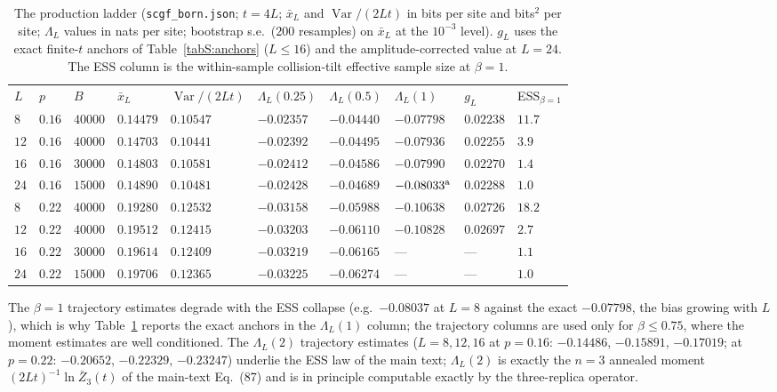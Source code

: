 \documentclass[aps,prx,reprint,superscriptaddress,nobibnotes,longbibliography]{revtex4-2}
\begin{document}
\begin{table}[t]
\caption{The production ladder (\texttt{scgf\_born.json}; $t=4L$;
$\bar x_L$ and $\operatorname{Var}/(2Lt)$ in bits per site and bits$^2$
per site; $\Lambda_L$ values in nats per site; bootstrap s.e.\ ($200$
resamples) on $\bar x_L$ at the $10^{-3}$ level).  $g_L$ uses the exact
finite-$t$ anchors of Table~\ref{tabS:anchors} ($L\le16$) and the
amplitude-corrected value at $L=24$.  The ESS column is the within-sample
collision-tilt effective sample size at $\beta=1$.}
\label{tabS:ladder}
\begin{ruledtabular}
\begin{tabular}{llllllllll}
$L$ & $p$ & $B$ & $\bar x_L$ & $\operatorname{Var}/(2Lt)$ &
$\Lambda_L(0.25)$ & $\Lambda_L(0.5)$ & $\Lambda_L(1)$ & $g_L$ &
ESS$_{\beta=1}$\\
\colrule
$8$ & $0.16$ & $40000$ & $0.14479$ & $0.10547$ & $-0.02357$ & $-0.04440$
 & $-0.07798$ & $0.02238$ & $11.7$\\
$12$ & $0.16$ & $40000$ & $0.14703$ & $0.10441$ & $-0.02392$ & $-0.04495$
 & $-0.07936$ & $0.02255$ & $3.9$\\
$16$ & $0.16$ & $30000$ & $0.14803$ & $0.10581$ & $-0.02412$ & $-0.04586$
 & $-0.07990$ & $0.02270$ & $1.4$\\
$24$ & $0.16$ & $15000$ & $0.14890$ & $0.10481$ & $-0.02428$ & $-0.04689$
 & $-0.08033^{\rm a}$ & $0.02288$ & $1.0$\\
$8$ & $0.22$ & $40000$ & $0.19280$ & $0.12532$ & $-0.03158$ & $-0.05988$
 & $-0.10638$ & $0.02726$ & $18.2$\\
$12$ & $0.22$ & $40000$ & $0.19512$ & $0.12415$ & $-0.03203$ & $-0.06110$
 & $-0.10828$ & $0.02697$ & $2.7$\\
$16$ & $0.22$ & $30000$ & $0.19614$ & $0.12409$ & $-0.03219$ & $-0.06165$
 & --- & --- & $1.1$\\
$24$ & $0.22$ & $15000$ & $0.19706$ & $0.12365$ & $-0.03225$ & $-0.06274$
 & --- & --- & $1.0$\\
\end{tabular}
\end{ruledtabular}
\end{table}

The $\beta=1$ trajectory estimates degrade with the ESS collapse
(e.g.\ $-0.08037$ at $L=8$ against the exact $-0.07798$, the bias growing
with $L$), which is why Table~\ref{tabS:ladder} reports the exact anchors
in the $\Lambda_L(1)$ column; the trajectory columns are used only for
$\beta\le0.75$, where the moment estimates are well conditioned.  The
$\Lambda_L(2)$ trajectory estimates ($L=8,12,16$ at $p=0.16$:
$-0.14486$, $-0.15891$, $-0.17019$; at $p=0.22$: $-0.20652$,
$-0.22329$, $-0.23247$) underlie the ESS law of the main text;
$\Lambda_L(2)$ is exactly the $n=3$ annealed moment
$(2Lt)^{-1}\ln\bar Z_3(t)$ of the main-text Eq.~(87) and is in
principle computable exactly by the three-replica operator.
\end{document}
